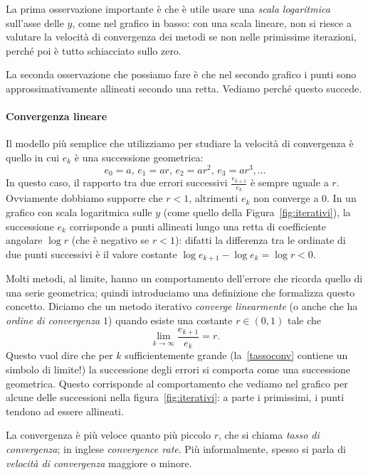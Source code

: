 \documentclass[a4paper]{report}
\theoremstyle{definition}
\theoremstyle{remark}
\begin{document}
La prima osservazione importante è che è utile usare una \emph{scala logaritmica} sull'asse delle $y$, come nel grafico in basso: con una scala lineare, non si riesce a valutare la velocità di convergenza dei metodi se non nelle primissime iterazioni, perché poi è tutto schiacciato sullo zero.

La seconda osservazione che possiamo fare è che nel secondo grafico i punti sono approssimativamente allineati secondo una retta. Vediamo perché questo succede.

\paragraph{Convergenza lineare} Il modello più semplice che utilizziamo per studiare la velocità di convergenza è quello in cui $e_k$ è una successione geometrica:
\[
e_0 = a,\, e_1 = ar,\, e_2 = ar^2,\, e_3 = ar^3, \dots
\]
In questo caso, il rapporto tra due errori successivi $\frac{e_{k+1}}{e_k}$ è sempre uguale a $r$. Ovviamente dobbiamo supporre che $r < 1$, altrimenti $e_k$ non converge a $0$. In un grafico con scala logaritmica sulle $y$ (come quello della Figura~\ref{fig:iterativi}), la successione $e_k$ corrisponde a punti allineati lungo una retta di coefficiente angolare $\log r$ (che è negativo se $r<1$): difatti la differenza tra le ordinate di due punti successivi è il valore costante $\log e_{k+1} - \log e_k = \log r < 0$.

Molti metodi, al limite, hanno un comportamento dell'errore che ricorda quello di una serie geometrica; quindi introduciamo una definizione che formalizza questo concetto. Diciamo che un metodo iterativo \emph{converge linearmente} (o anche che ha \emph{ordine di convergenza $1$}) quando esiste una costante $r\in (0,1)$ tale che
\begin{equation} \label{tassoconv}
    \lim_{k \to \infty }\frac{e_{k+1}}{e_k} = r.
\end{equation}
Questo vuol dire che per $k$ sufficientemente grande (la~\eqref{tassoconv} contiene un simbolo di limite!) la successione degli errori si comporta come una successione geometrica. Questo corrisponde al comportamento che vediamo nel grafico per alcune delle successioni nella figura~\ref{fig:iterativi}: a parte i primissimi, i punti tendono ad essere allineati.

La convergenza è più veloce quanto più piccolo $r$, che si chiama \emph{tasso di convergenza}; in inglese \emph{convergence rate}. Più informalmente, spesso si parla di \emph{velocità di convergenza} maggiore o minore.
\end{document}
